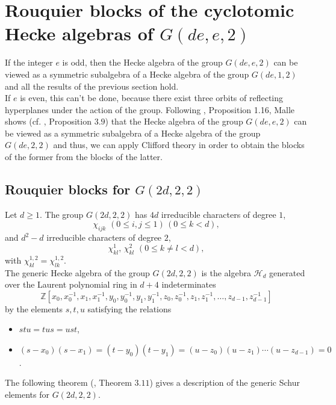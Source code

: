 \documentclass[10pt,a4paper,titlepage]{article}
\begin{document}
\section {Rouquier blocks of the cyclotomic Hecke algebras of $G(de,e,2)$}



If the integer $e$ is odd, then the Hecke algebra of the group $G(de,e,2)$ can be viewed as a symmetric subalgebra of a Hecke algebra of the group $G(de,1,2)$ and all the results of the previous section hold.\\

If $e$ is even, this can't be done, because there exist three orbits of reflecting hyperplanes under the action of the group. Following \cite{Ariki}, Proposition 1.16, Malle shows (cf.  \cite{Ma2}, Proposition $3.9$) that the Hecke algebra of the group 
$G(de,e,2)$ can be viewed as a symmetric subalgebra of a Hecke algebra of the group $G(de,2,2)$ and thus, we can apply Clifford theory in order to obtain the blocks of the former from the blocks of the latter. 

\subsection{Rouquier blocks for $G(2d,2,2)$}

Let $d\geq 1$. The group $G(2d,2,2)$ has $4d$ irreducible characters of degree $1$, 
$$\chi_{ijk} \,\,(0 \leq i,j\leq 1)\,(0 \leq k < d),$$
and $d^2-d$ irreducible characters of degree $2$,
$$\chi_{kl}^{1},\, \chi_{kl}^{2}\,\,(0 \leq k \neq l < d),$$
with $\chi_{kl}^{1,2}=\chi_{lk}^{1,2}$.\\

The generic Hecke algebra of the group $G(2d,2,2)$ is the algebra $\mathcal{H}_{d}$ generated over the Laurent  polynomial ring in $d+4$ indeterminates  
$$\mathbb{Z}[x_0,x_0^{-1},x_1,x_1^{-1},y_0,y_0^{-1},y_1,y_1^{-1},z_0,z_0^{-1},z_1,z_1^{-1},\ldots,z_{d-1},z_{d-1}^{-1}]$$
by the elements $s,t,u$ satisfying the relations
\begin{itemize}
\item $stu=tus=ust$,
\item $(s-x_0)(s-x_1)=(t-y_0)(t-y_1)=(u-z_0)(u-z_1)\cdots(u-z_{d-1})=0$.
\end{itemize}

The following theorem (\cite{Ma2}, Theorem $3.11$) gives a  description of the generic Schur elements for $G(2d,2,2)$.
\end{document}
